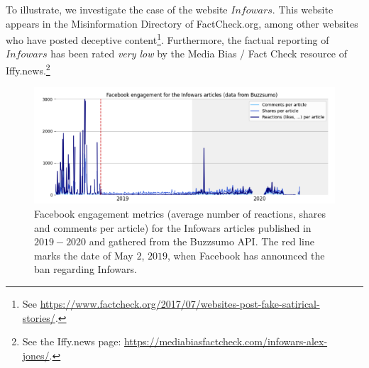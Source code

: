 \documentclass{article}
\begin{document}

\smallskip

To illustrate, we investigate the case of the website $Infowars$. This website appears in the Misinformation Directory of FactCheck.org, among other websites who have posted deceptive content\footnote{See \href{https://www.factcheck.org/2017/07/websites-post-fake-satirical-stories/}{https://www.factcheck.org/2017/07/websites-post-fake-satirical-stories/}.}. Furthermore, the factual reporting of $Infowars$ has been rated {\it very low} by the Media Bias / Fact Check resource of Iffy.news.\footnote{See the Iffy.news page: \href{https://mediabiasfactcheck.com/infowars-alex-jones/}{https://mediabiasfactcheck.com/infowars-alex-jones/}.} 

\begin{figure}
	\centering
	
		\includegraphics[scale=0.35]{./img/infowars/fb_infowars_3.png}

	\caption{Facebook engagement metrics (average number of reactions, shares and comments per article) for the Infowars articles published in $2019-2020$ and gathered from the Buzzsumo API. The red line marks the date of May $2$, $2019$, when Facebook has announced the ban regarding Infowars.}
	\label{infowars2}
\end{figure}
\end{document}
